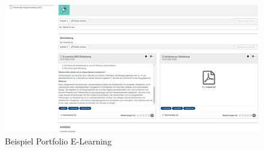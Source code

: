 \documentclass[a4paper,oneside]{scrarticle}
\begin{document}
	\begin{figure}[h]
		\centering
		\includegraphics[width=0.8\linewidth]{010_beispielPortfolio2}
		\caption{Beispiel Portfolio E-Learning}
		\label{fig:010beispielportfolio2}
	\end{figure}
	
	
	
	
\end{document}
